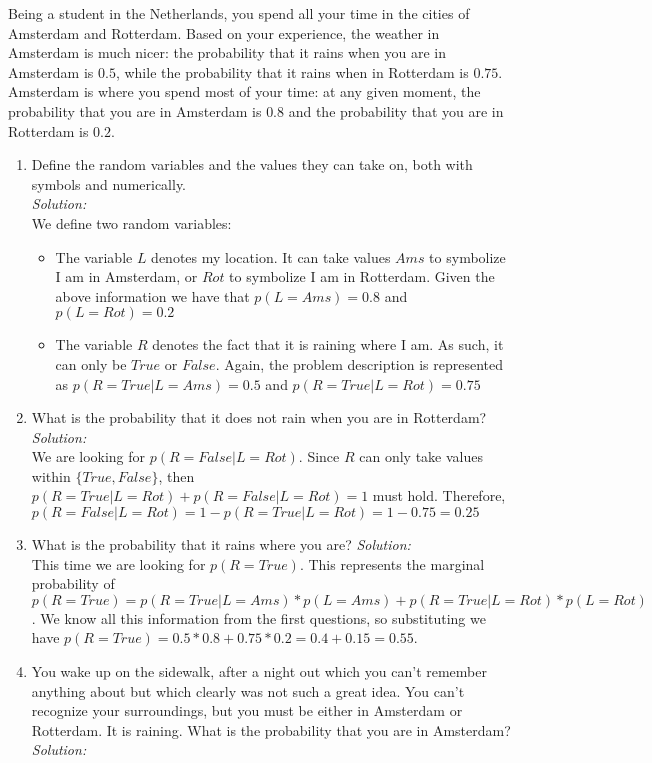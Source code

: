 \documentclass{../amsml}
\begin{document}

\begin{problem}
Being a student in the Netherlands, you spend all your time in the cities of Amsterdam and Rotterdam. Based on your experience, the weather in Amsterdam is much nicer: the probability that it rains when you are in Amsterdam is $0.5$, while the probability that it rains when in Rotterdam is $0.75$. Amsterdam is where you spend most of your time: at any given moment, the probability that you are in Amsterdam is $0.8$ and the probability that you are in Rotterdam is $0.2$.	
	
\begin{enumerate}
	\item Define the random variables and the values they can take on, both with symbols and numerically. \\
		\emph{Solution:} \\
			We define two random variables:
			\begin{itemize}
				\item The variable $L$ denotes my location. It can take values $Ams$ to symbolize I am in Amsterdam, or $Rot$ to symbolize I am in Rotterdam. Given the above information we have that  $p(L=Ams) = 0.8$ and $p(L=Rot) = 0.2$ 
				\item The variable $R$ denotes the fact that it is raining where I am. As such, it can only be $True$ or $False$. Again, the problem description is represented as $p(R=True | L = Ams) = 0.5$ and $p(R=True | L = Rot) = 0.75$
			\end{itemize}
	\item What is the probability that it does not rain when you are in Rotterdam? \\
		\emph{Solution:} \\
			We are looking for $p(R=False | L= Rot)$. Since $R$ can only take values within $\{True, False\}$, then
			$p(R=True | L = Rot) + p(R=False | L = Rot) = 1$ must hold. Therefore,
			 $p(R=False | L = Rot) = 1 - p(R=True | L = Rot) = 1 - 0.75 = 0.25$
	\item What is the probability that it rains where you are?
		\emph{Solution:} \\
			This time we are looking for $p(R=True)$. This represents the marginal probability of $p(R=True) = p(R=True | L = Ams) * p(L=Ams) + p(R=True | L = Rot) * p(L=Rot)$. We know all this information from the first questions, so substituting we have  $p(R=True) = 0.5 * 0.8 + 0.75 * 0.2 = 0.4 + 0.15 = 0.55$.
	\item You wake up on the sidewalk, after a night out which you can't remember anything about but which clearly was not such a great idea. You can't recognize your surroundings, but you must be either in Amsterdam or Rotterdam. It is raining. What is the probability that you are in Amsterdam?
		\emph{Solution:} \\
	
\end{enumerate}
\end{problem}
\end{document}
